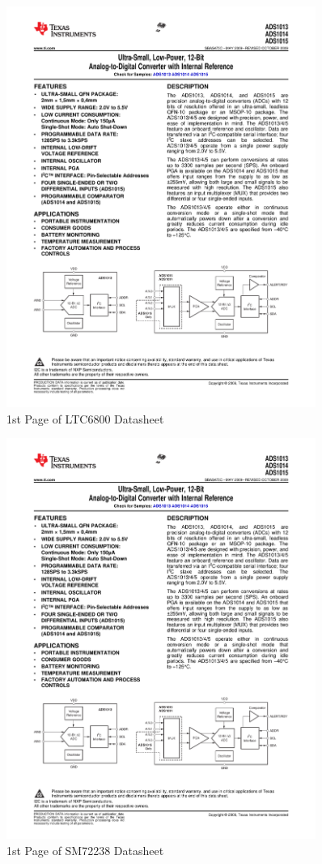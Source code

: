 \documentclass{article}
\numberwithin{figure}{section}
\numberwithin{equation}{section}
\begin{document}
{\begin{figure}[H]
	\centering
	\includegraphics[page=10,width=0.9\textwidth]{combined.pdf}
	\caption{1st Page of LTC6800 Datasheet}
	\label{fig:ltc6800dat}
\end{figure}

\begin{figure}[H]
	\centering
	\includegraphics[page=11,width=0.9\textwidth]{combined.pdf}
	\caption{1st Page of SM72238 Datasheet}
	\label{fig:sm72dat}
\end{figure}

}
\end{document}
